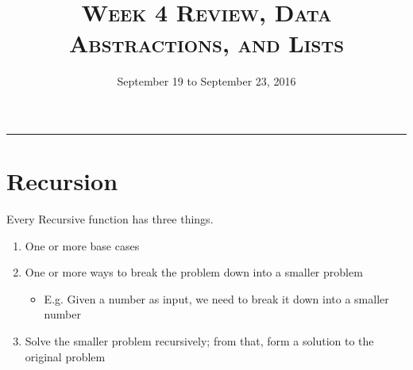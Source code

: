 \documentclass{exam}
\title{\textsc{Week 4 Review, Data Abstractions, and Lists}}
\date{September 19 to September 23, 2016}
\begin{document}
\maketitle
\rule{\textwidth}{0.15em}
\fontsize{12}{15}\selectfont

\section{Recursion}

Every Recursive function has three things.
\begin{enumerate}
\item One or more base cases
\item One or more ways to break the problem down into a smaller problem
\begin{itemize}
\item E.g. Given a number as input, we need to break it down into a smaller number
\end{itemize}
\item Solve the smaller problem recursively; from that, form a solution to the original problem
\end{enumerate}
\end{document}
